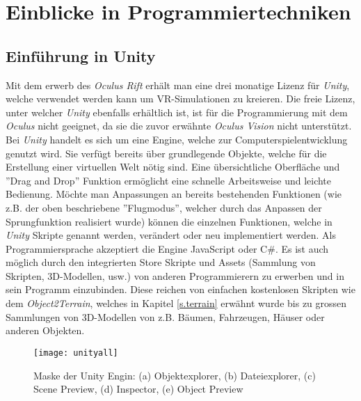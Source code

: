 \chapter{Einblicke in Programmiertechniken}\label{c.programing}
\vspace{-20pt}
\section{Einführung in Unity}\label{s.unity}
Mit dem erwerb des \textit{Oculus Rift} erhält man eine drei monatige Lizenz für \textit{Unity}, welche verwendet werden kann um VR-Simulationen zu kreieren. Die freie Lizenz, unter welcher \textit{Unity} ebenfalls erhältlich ist, ist für die Programmierung mit dem \textit{Oculus} nicht geeignet, da sie die zuvor erwähnte \textit{Oculus Vision} nicht unterstützt.\\[6pt]
Bei \textit{Unity} handelt es sich um eine Engine, welche zur Computerspielentwicklung genutzt wird. Sie verfügt bereits über grundlegende Objekte, welche für die Erstellung einer virtuellen Welt nötig sind. Eine übersichtliche Oberfläche und ''Drag and Drop'' Funktion ermöglicht eine schnelle Arbeitsweise und leichte Bedienung. Möchte man Anpassungen an bereits bestehenden Funktionen (wie z.B. der oben beschriebene ''Flugmodus'', welcher durch das Anpassen der Sprungfunktion realisiert wurde) können die einzelnen Funktionen, welche in \textit{Unity} Skripte genannt werden, verändert oder neu implementiert werden. Als Programmiersprache akzeptiert die Engine JavaScript oder C\#. Es ist auch möglich durch den integrierten Store Skripte und Assets (Sammlung von Skripten, 3D-Modellen, usw.) von anderen Programmierern zu erwerben und in sein Programm einzubinden. Diese reichen von einfachen kostenlosen Skripten wie dem \textit{Object2Terrain}, welches in Kapitel \ref{s.terrain} erwähnt wurde bis zu grossen Sammlungen von 3D-Modellen von z.B. Bäumen, Fahrzeugen, Häuser oder anderen Objekten.\\[6pt]

\newpage
\begin{figure}[ht]
	\vspace{-20pt}
	\begin{center}
		\texttt{[image: unityall]}
	\end{center}
	\vspace{-15pt}
	\caption[Maske der Unity Engin]{Maske der Unity Engin: (a) Objektexplorer, (b) Dateiexplorer, (c) Scene Preview, (d) Inspector, (e) Object Preview}\label{unityall}
	\vspace{-12pt}
\end{figure}


